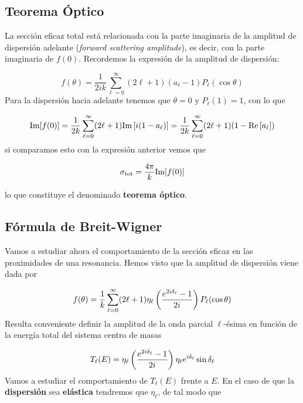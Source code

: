 \subsection{Teorema Óptico}
La sección eficaz total está relacionada con la parte imaginaria de la amplitud de dispersión adelante (\textit{forward scattering amplitude}), es decir, con la parte imaginaria de $f(0)$. Recordemos la expresión de la amplitud de dispersión:

\begin{equation}
	f(\theta) = \frac{1}{2ik} \sum_{\ell = 0}^{\infty} (2\ell +1 ) (a_{\ell}-1)P_{\ell} (\cos \theta)
\end{equation}
Para la dispersión hacia adelante tenemos que $\theta=0$ y $P_\ell (1)=1$, con lo que

\begin{equation}
	\mathrm{Im} [f(0)] = \frac{1}{2k} \sum_{\ell=0}^{\infty} (2\ell + 1) \mathrm{Im} \left[ i(1-a_\ell) \right] = \frac{1}{2k} \sum_{\ell=0}^{\infty} (2\ell+1) (1-\mathrm{Re} \left[ a_\ell \right])
\end{equation}
si comparamos esto con la expresión anterior vemos que

\begin{mybox}
	\begin{equation}
		\sigma_{\text{tot}} = \frac{4\pi}{k} \mathrm{Im} [f(0)]
	\end{equation}
\end{mybox}
lo que constituye el denominado \textbf{teorema óptico}.

\subsection{Fórmula de Breit-Wigner}

Vamos a estudiar ahora el comportamiento de la sección eficaz en las proximidades de una resonancia. Hemos visto que la amplitud de dispersión viene dada por

\begin{equation}
	f(\theta) = \frac{1}{k} \sum_{\ell=0}^{\infty} (2\ell+1) \eta_\ell \left( \frac{e^{2i\delta_\ell}-1}{2i} \right) P_\ell (\cos \theta)
\end{equation}
Resulta conveniente definir la amplitud de la onda parcial $\ell$-ésima en función de la energía total del sistema centro de masas 

\begin{equation}
	T_\ell (E) = \eta_\ell \left( \frac{e^{2i\delta_\ell}-1}{2i} \right) \eta_\ell e^{i\delta_\ell} \sin \delta_\ell
\end{equation}
Vamos a estudiar el comportamiento de $T_\ell (E)$ frente a $E$. En el caso de que la \textbf{dispersión} sea \textbf{elástica} tendremos que $\eta_\ell$, de tal modo que 

